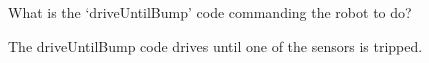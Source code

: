 What is the ‘driveUntilBump’ code commanding the robot to do?

\begin{solution}
    The driveUntilBump code drives until one of the sensors is tripped.
\end{solution}